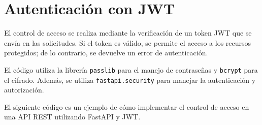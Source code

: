 \chapter{Autenticación con JWT}

\label{AppendixC}
El control de acceso se realiza mediante la verificación de un token JWT que se
envía en las solicitudes. Si el token es válido, se permite el acceso a los
recursos protegidos; de lo contrario, se devuelve un error de autenticación.

El código utiliza la librería \texttt{passlib} para el manejo de contraseñas
y \texttt{bcrypt} para el cifrado. Además, se utiliza \texttt{fastapi.security}
para manejar la autenticación y autorización.

El siguiente código es un ejemplo de cómo implementar el control de acceso en
una API REST utilizando FastAPI y JWT.



